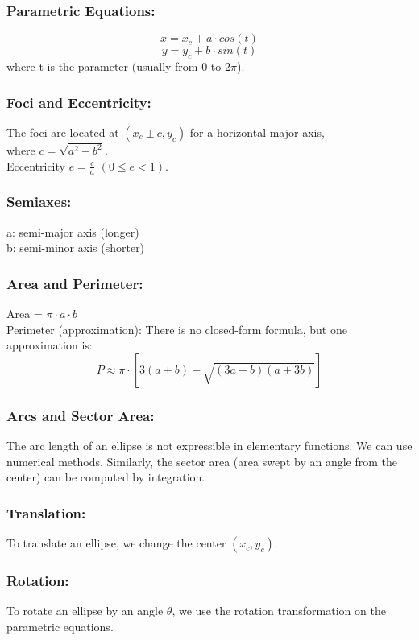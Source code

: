 \documentclass[a4paper,14pt]{article}
\begin{document}
\subsubsection{Parametric Equations:}
    \[ x = x_c + a \cdot cos(t) \]
    \[ y = y_c + b \cdot sin(t) \]
    where t is the parameter (usually from 0 to 2\(\pi\)).
\subsubsection{Foci and Eccentricity:}
    The foci are located at \((x_c \pm c, y_c)\) for a horizontal major axis,\\ where \(c = \sqrt{a^2 - b^2}\).\\
    Eccentricity \(e = \frac{c}{a}\,\,(0 \leq e < 1)\).\\
\subsubsection{Semiaxes:}
    a: semi-major axis (longer)\\
    b: semi-minor axis (shorter)\\
\subsubsection{Area and Perimeter:}
    Area = \( \pi \cdot a \cdot b \)\\
    Perimeter (approximation): There is no closed-form formula, but one approximation is:
       \[ P \approx \pi \cdot [ 3(a+b) - \sqrt{(3a+b)(a+3b)} ] \]
\subsubsection{Arcs and Sector Area:}
    The arc length of an ellipse is not expressible in elementary functions. We can use numerical methods.
    Similarly, the sector area (area swept by an angle from the center) can be computed by integration.
\subsubsection{Translation:}
    To translate an ellipse, we change the center \((x_c, y_c)\).
\subsubsection{Rotation:}
    To rotate an ellipse by an angle \(\theta\), we use the rotation transformation on the parametric equations.
\end{document}
